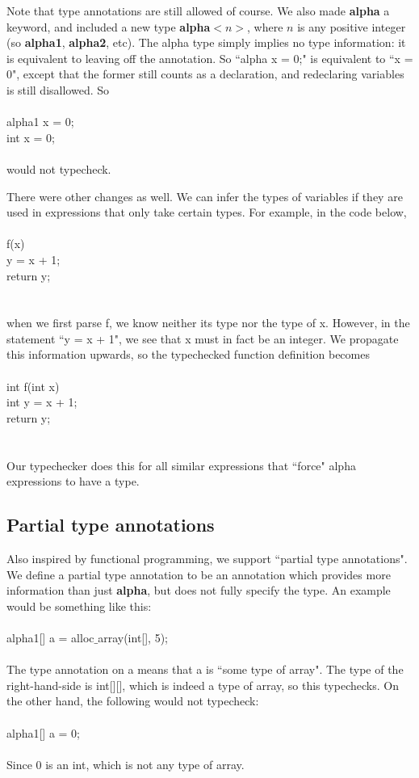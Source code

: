 \documentclass{article}
\begin{document}
Note that type annotations are still allowed of course. We also made \textbf{alpha} a keyword, and included a new type \textbf{alpha}$<n>$, where $n$ is any positive integer (so \textbf{alpha1}, \textbf{alpha2}, etc). The alpha type simply implies no type information: it is equivalent to leaving off the annotation. So ``alpha x = 0;" is equivalent to ``x = 0", except that the former still counts as a declaration, and redeclaring variables is still disallowed. So\\
\\
alpha1 x = 0;\\
int x = 0;\\
\\
would not typecheck.

There were other changes as well. We can infer the types of variables if they are used in expressions that only take certain types. For example, in the code below,\\
\\
f(x) { \\
  y = x + 1; \\
  return y; \\
} \\
\\
when we first parse f, we know neither its type nor the type of x. However, in the statement ``y = x + 1", we see that x must in fact be an integer. We propagate this information upwards, so the typechecked function definition becomes\\
\\
int f(int x) { \\
  int y = x + 1; \\
  return y; \\
} \\
\\
Our typechecker does this for all similar expressions that ``force" alpha expressions to have a type.

\subsection{Partial type annotations}
Also inspired by functional programming, we support ``partial type annotations". We define a partial type annotation to be an annotation which provides more information than just \textbf{alpha}, but does not fully specify the type. An example would be something like this:\\
\\
alpha1[] a = alloc$\_$array(int[], 5);\\
\\
The type annotation on a means that a is ``some type of array". The type of the right-hand-side is int[][], which is indeed a type of array, so this typechecks. On the other hand, the following would not typecheck:\\
\\
alpha1[] a = 0;\\
\\
Since 0 is an int, which is not any type of array.
\end{document}
